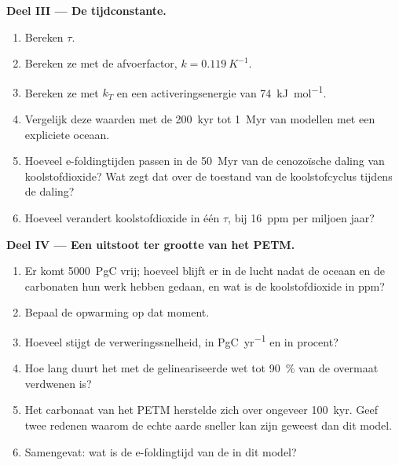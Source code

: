 \begin{problem}
\noindent\textbf{Deel III --- De tijdconstante.}
\begin{enumerate}[resume]
  \item Bereken $\tau$.
  \item Bereken ze met de afvoerfactor, $k = \qty{0.119}{K^{-1}}$.
  \item Bereken ze met $k_T$ en een activeringsenergie van \qty{74}{kJ.mol^{-1}}.
  \item Vergelijk deze waarden met de \qty{200}{kyr} tot \qty{1}{Myr} van modellen met een expliciete oceaan.
  \item Hoeveel e-foldingtijden passen in de \qty{50}{Myr} van de cenozoïsche daling van
        koolstofdioxide? Wat zegt dat over de toestand van de koolstofcyclus tijdens de daling?
  \item Hoeveel verandert koolstofdioxide in één $\tau$, bij \qty{16}{ppm} per miljoen jaar?
\end{enumerate}

\noindent\textbf{Deel IV --- Een uitstoot ter grootte van het PETM.}
\begin{enumerate}[resume]
  \item Er komt \qty{5000}{PgC} vrij; hoeveel blijft er in de lucht nadat de oceaan en de carbonaten
        hun werk hebben gedaan, en wat is de koolstofdioxide in ppm?
  \item Bepaal de opwarming op dat moment.
  \item Hoeveel stijgt de verweringssnelheid, in \unit{PgC.yr^{-1}} en in procent?
  \item Hoe lang duurt het met de gelineariseerde wet tot \qty{90}{\percent} van de overmaat verdwenen is?
  \item Het carbonaat van het PETM herstelde zich over ongeveer \qty{100}{kyr}. Geef twee redenen waarom de echte
        aarde sneller kan zijn geweest dan dit model.
  \item Samengevat: wat is de e-foldingtijd van de  in dit model?
\end{enumerate}
\end{problem}
